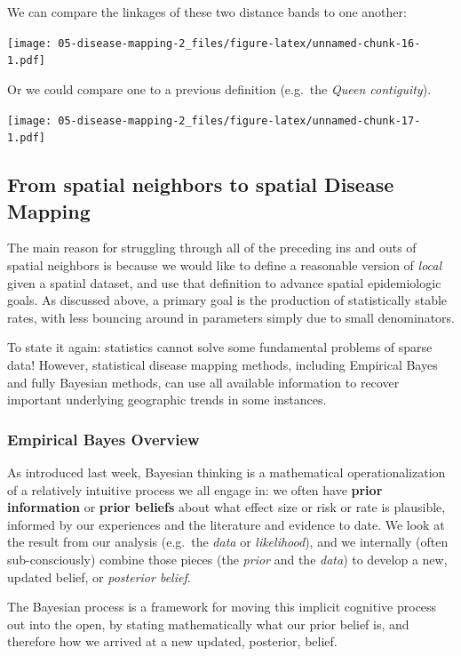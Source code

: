 \documentclass[
]{book}
\begin{document}
We can compare the linkages of these two distance bands to one another:

\texttt{[image: 05-disease-mapping-2\_files/figure-latex/unnamed-chunk-16-1.pdf]}

Or we could compare one to a previous definition (e.g.~the \emph{Queen contiguity}).

\texttt{[image: 05-disease-mapping-2\_files/figure-latex/unnamed-chunk-17-1.pdf]}

\hypertarget{from-spatial-neighbors-to-spatial-disease-mapping}{%
\subsection{From spatial neighbors to spatial Disease Mapping}\label{from-spatial-neighbors-to-spatial-disease-mapping}}

The main reason for struggling through all of the preceding ins and outs of spatial neighbors is because we would like to define a reasonable version of \emph{local} given a spatial dataset, and use that definition to advance spatial epidemiologic goals. As discussed above, a primary goal is the production of statistically stable rates, with less bouncing around in parameters simply due to small denominators.

To state it again: statistics cannot solve some fundamental problems of sparse data! However, statistical disease mapping methods, including Empirical Bayes and fully Bayesian methods, can use all available information to recover important underlying geographic trends in some instances.

\hypertarget{empirical-bayes-overview}{%
\subsubsection{Empirical Bayes Overview}\label{empirical-bayes-overview}}

As introduced last week, Bayesian thinking is a mathematical operationalization of a relatively intuitive process we all engage in: we often have \textbf{prior information} or \textbf{prior beliefs} about what effect size or risk or rate is plausible, informed by our experiences and the literature and evidence to date. We look at the result from our analysis (e.g.~the \emph{data} or \emph{likelihood}), and we internally (often sub-consciously) combine those pieces (the \emph{prior} and the \emph{data}) to develop a new, updated belief, or \emph{posterior belief}.

The Bayesian process is a framework for moving this implicit cognitive process out into the open, by stating mathematically what our prior belief is, and therefore how we arrived at a new updated, posterior, belief.
\end{document}
